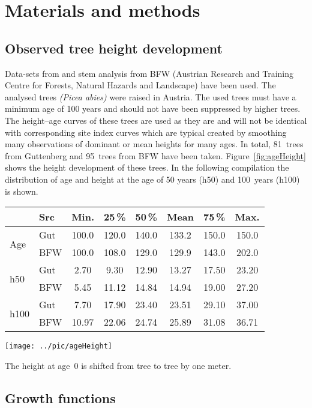 \documentclass[a4paper,twocolumn]{article}
\begin{document}
\section{Materials and methods}

\subsection{Observed tree height development}

Data-sets from \cite{guttenberg1915Hochgebirge} and stem analysis from
BFW (Austrian Research and Training Centre for Forests, Natural
Hazards and Landscape) have been used. The analysed trees
\textit{(Picea abies)} were raised in Austria. The used trees must
have a minimum age of 100 years and should not have been suppressed by
higher trees. The height--age curves of these trees are used as they
are and will not be identical with corresponding site index curves
which are typical created by smoothing many observations of dominant
or mean heights for many ages.
In total, 81~trees from Guttenberg and 95~trees from BFW
have been taken. Figure~\ref{fig:ageHeight} shows the height
development of these trees. In the following compilation the
distribution of age and height at the age of 50 years (h50) and
100~years (h100) is shown.

\begin{tabular}{llcccccc}
 &Src  & Min.& 25\,\%&  50\,\%& Mean& 75\,\%& Max.\\
 \hline
 \multirow{2}{*}{Age}& Gut& 100.0& 120.0& 140.0& 133.2& 150.0& 150.0\\
 & BFW& 100.0& 108.0& 129.0& 129.9& 143.0& 202.0\\[0.3em]
 \multirow{2}{*}{h50}& Gut& 2.70& 9.30& 12.90& 13.27& 17.50& 23.20\\
 & BFW& 5.45& 11.12& 14.84& 14.94& 19.00& 27.20\\[0.3em]
 \multirow{2}{*}{h100}&Gut& 7.70& 17.90& 23.40& 23.51& 29.10& 37.00\\
 & BFW& 10.97& 22.06& 24.74& 25.89& 31.08& 36.71
\end{tabular}

\begin{figure*}[htbp]
  \centering
  \texttt{[image: ../pic/ageHeight]}
  \caption{Height development of the trees}
  \label{fig:ageHeight}
  \scriptsize{The height at age~0 is shifted from tree to tree by one meter.}
\end{figure*}


\subsection{Growth functions}
\end{document}
